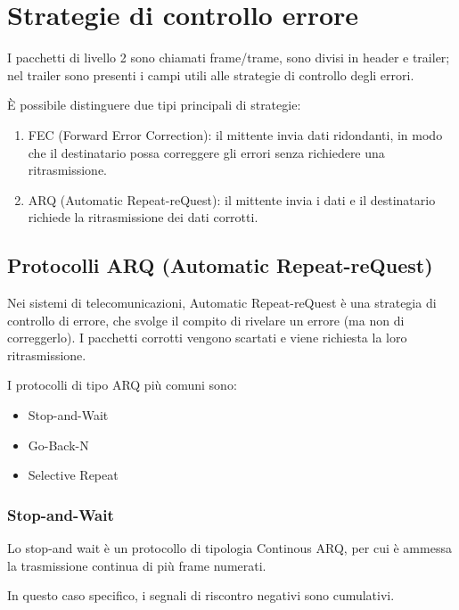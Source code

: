 \section{Strategie di controllo errore}
I pacchetti di livello 2 sono chiamati frame/trame, sono divisi in header e trailer; nel trailer sono presenti i campi utili alle strategie di controllo degli errori.

È possibile distinguere due tipi principali di strategie:
\begin{enumerate}
    \item FEC (Forward Error Correction): il mittente invia dati ridondanti, in modo che il destinatario possa correggere gli errori senza richiedere una ritrasmissione.
    \item ARQ (Automatic Repeat-reQuest): il mittente invia i dati e il destinatario richiede la ritrasmissione dei dati corrotti. 
\end{enumerate}
\subsection{Protocolli ARQ (Automatic Repeat-reQuest)}
Nei sistemi di telecomunicazioni, Automatic Repeat-reQuest è una strategia di controllo di errore, che svolge il compito di rivelare un errore (ma non di correggerlo). I pacchetti corrotti vengono scartati e viene richiesta la loro ritrasmissione.

I protocolli di tipo ARQ più comuni sono:
\begin{itemize}
    \item Stop-and-Wait 
    \item Go-Back-N 
    \item Selective Repeat
\end{itemize}


\newpage
\subsubsection{Stop-and-Wait}
Lo stop-and wait è un protocollo di tipologia Continous ARQ, per cui è ammessa la trasmissione continua di più frame numerati.

In questo caso specifico, i segnali di riscontro negativi sono cumulativi.

